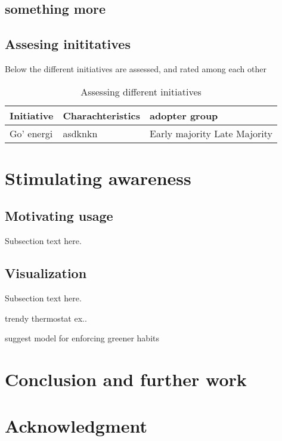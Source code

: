 \documentclass[conference]{IEEEtran}
\begin{document}
\subsection{something more}


\subsection{Assesing inititatives}
Below the different initiatives are assessed, and rated among each other

\begin{table}[t2]
\caption{Assessing different initiatives} %
\centering  %
\begin{tabular}{|p{} |p{3.5cm} |p{2.5cm}|} %
\hline\hline                        %
Initiative & Charachteristics & adopter group \\ [0.5ex] %
\hline                  %
Go' energi & asdknkn & Early majority Late Majority  \\
\hline
\end{tabular}
\label{table:nonlin} %
\end{table}





\section{Stimulating awareness}

\subsection{Motivating usage}
Subsection text here.

\subsection{Visualization}
Subsection text here.

trendy thermostat ex..

suggest model for enforcing greener habits
\section{Conclusion and further work}


\section*{Acknowledgment}
\end{document}
